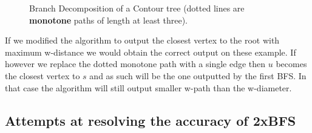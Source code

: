 \begin{figure}[h]
    \qquad
    \caption{Branch Decomposition of a Contour tree (dotted lines are \textbf{monotone} paths of length at least three).}%
    \label{fig:path-cases}%
\end{figure}

If we modified the algorithm to output the closest vertex to the root with maximum w-distance we would obtain the correct output on these example. If however we replace the dotted monotone path with a single edge then $u$ becomes the closest vertex to $s$ and as such will be the one outputted by the first BFS. In that case the algorithm will still output smaller w-path than the w-diameter.


\subsection{Attempts at resolving the accuracy of 2xBFS}



